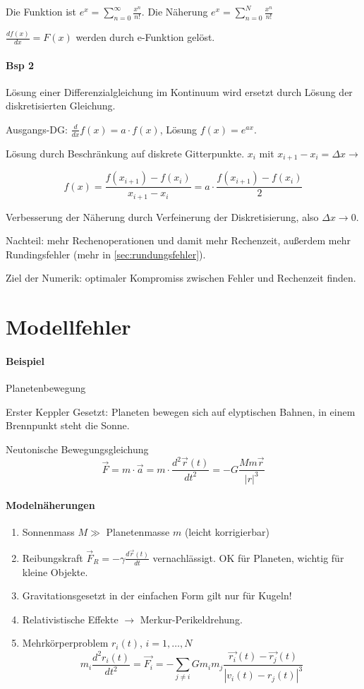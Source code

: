 \documentclass[a4paper,ngerman]{scrbook}
\begin{document}
Die Funktion ist $e^x = \displaystyle\sum^\infty_{n=0} \frac{x^n}{n!}$. Die Näherung $e^x = \displaystyle\sum^N_{n=0} \frac{x^n}{n!}$

$\displaystyle\frac{df(x)}{dx} = F(x)$ werden durch e-Funktion gelöst.

\paragraph{Bsp 2}
Lösung einer Differenzialgleichung im Kontinuum wird ersetzt durch Lösung der diskretisierten Gleichung.

Ausgangs-DG: $\displaystyle\frac{d}{dx}f(x) = a\cdot f(x)$, Lösung $f(x) = e^{ax}$.

Lösung durch Beschränkung auf diskrete Gitterpunkte. $x_i$ mit $x_{i+1} - x_i = \Delta x \to$

\[
f(x) = \frac{f(x_{i+1}) - f(x_i)}{x_{i+1} - x_i} = a\cdot \frac{f(x_{i+1}) - f(x_i)}{2}
\]

Verbesserung der Näherung durch Verfeinerung der Diskretisierung, also $\Delta x \to 0$.

Nachteil: mehr Rechenoperationen und damit mehr Rechenzeit, außerdem mehr Rundingsfehler (mehr in \autoref{sec:rundungsfehler}).

Ziel der Numerik: optimaler Kompromiss zwischen Fehler und Rechenzeit finden.
\section{Modellfehler}
\label{sec:modellfehler}

\paragraph{Beispiel}
Planetenbewegung

Erster Keppler Gesetzt: Planeten bewegen sich auf elyptischen Bahnen, in einem Brennpunkt steht die Sonne.

Neutonische Bewegungsgleichung
\[
\vec{F} = m\cdot \vec{a} = m\cdot \frac{d^2\vec{r}(t)}{dt^2} = -G \frac{Mm\vec{r}}{|r|^3}
\]

\paragraph{Modelnäherungen}

\begin{enumerate}
\item Sonnenmass $M \gg$ Planetenmasse $m$ (leicht korrigierbar)
\item Reibungskraft $\vec{F}_R = -\gamma \frac{d\vec{r}(t)}{dt}$ vernachlässigt. OK für Planeten, wichtig für kleine Objekte.
\item Gravitationsgesetzt in der einfachen Form gilt nur für Kugeln!
\item Relativistische Effekte $\to$ Merkur-Perikeldrehung.
\item Mehrkörperproblem $r_i(t)$, $i=1,\dots,N$
  \[
  m_i \frac{d^2r_i(t)}{dt^2} = \vec{F_i} = -\sum_{j\neq i} G m_i m_j \frac{\vec{r_i}(t) - \vec{r_j}(t)}{|v_i(t) - r_j(t)|^3}
  \]
\end{enumerate}
\end{document}
